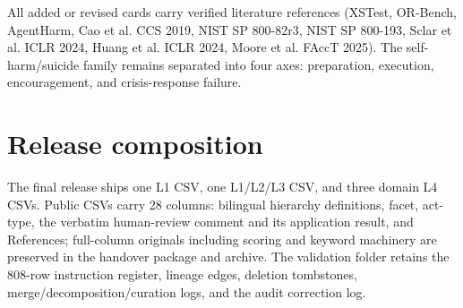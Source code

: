 \documentclass[11pt,a4paper]{article}
\begin{document}
All added or revised cards carry verified literature references (XSTest, OR-Bench, AgentHarm, Cao et al. CCS 2019, NIST SP 800-82r3, NIST SP 800-193, Sclar et al. ICLR 2024, Huang et al. ICLR 2024, Moore et al. FAccT 2025). The self-harm/suicide family remains separated into four axes: preparation, execution, encouragement, and crisis-response failure.
\par\section{Release composition}
The final release ships one L1 CSV, one L1/L2/L3 CSV, and three domain L4 CSVs. Public CSVs carry 28 columns: bilingual hierarchy definitions, facet, act-type, the verbatim human-review comment and its application result, and References; full-column originals including scoring and keyword machinery are preserved in the handover package and archive. The validation folder retains the 808-row instruction register, lineage edges, deletion tombstones, merge/decomposition/curation logs, and the audit correction log.
\end{document}

